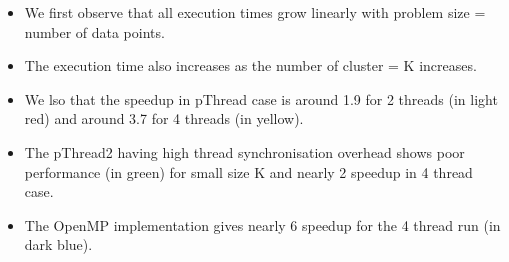 \documentclass[a4paper, 11pt]{article}
\begin{document}
\begin{itemize}
    \item We first observe that all execution times grow linearly with problem size = number of data points.
    \item The execution time also increases as the number of cluster = K increases.
    \item We lso that the speedup in pThread case is around 1.9 for 2 threads (in light red) and around 3.7 for 4 threads (in yellow). 
    \item The pThread2 having high thread synchronisation overhead shows poor performance (in green) for small size K and nearly 2 speedup in 4 thread case.
    \item The OpenMP implementation gives nearly 6 speedup for the 4 thread run (in dark blue).
\end{itemize}
\end{document}
